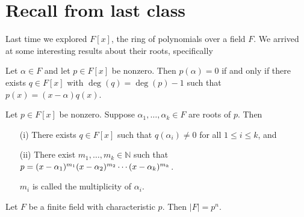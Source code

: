 
\section{Recall from last class}
Last time we explored \(F[x]\), the ring of polynomials over a field \(F\). We arrived at some interesting results about their roots, specifically
\begin{lemma}[Descartes]
    Let \(\alpha  \in F\) and let \(p \in F[x]\) be nonzero. Then \(p(\alpha )=0\) if and only if there exists \(q \in F[x]\) with \(\deg(q)=\deg(p)-1\) such that \(p(x)=(x-\alpha )q(x)\).
\end{lemma} 
\begin{corollary}[\textcolor{green}{ask sarah}]
    Let \(p \in F[x]\) be nonzero. Suppose \(\alpha_1 , \dots , \alpha _k \in F\) are roots of \(p\). Then
    \begin{itemize}
        \item[(i)] There exists \(q \in F[x]\) such that \(q(\alpha _i) \neq 0\) for all \(1\leq i\leq k\), and
        \item[(ii)] There exist \(m_1, \dots , m_k \in \mathbb{N} \) such that \(p = (x-\alpha _1)^{m_1}(x-\alpha _2)^{m_2} \cdots \\ (x-\alpha _k)^{m_k}\).
        \begin{remark}
            \(m_i\) is called the multiplicity of \(\alpha _i\).
        \end{remark}
    \end{itemize}   
\end{corollary}
\begin{fact}
    Let \(F\) be a finite field with characteristic \(p\). Then \(\vert F \vert = p^n \).
\end{fact}

